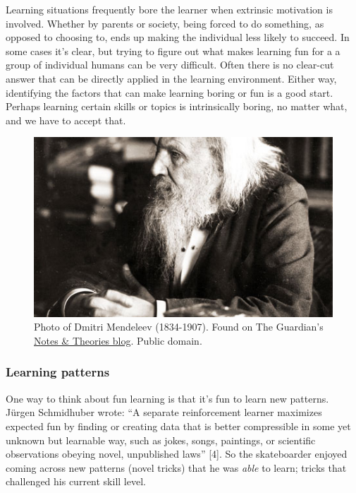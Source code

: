 Learning situations frequently bore the learner when extrinsic
motivation is involved. Whether by parents or society, being forced to
do something, as opposed to choosing to, ends up making the individual
less likely to succeed. In some cases it's clear, but trying to figure
out what makes learning fun for a a group of individual humans can be
very difficult. Often there is no clear-cut answer that can be directly
applied in the learning environment. Either way, identifying the factors
that can make learning boring or fun is a good start. Perhaps learning
certain skills or topics is intrinsically boring, no matter what, and we
have to accept that.

\begin{figure}
\begin{center}
\includegraphics[width=.8\textwidth]{./pictures/mendeleev.jpg}
\caption{Photo of Dmitri Mendeleev (1834-1907). Found on The Guardian's \href{http://www.guardian.co.uk/science/blog/2011/dec/07/dmitri-mendeleev-business-card}{Notes \& Theories blog}. Public domain.}
\end{center}
\end{figure}


\subsubsection{Learning patterns}

One way to think about fun learning is that it's fun to learn new
patterns. Jürgen Schmidhuber wrote: ``A separate reinforcement learner
maximizes expected fun by finding or creating data that is better
compressible in some yet unknown but learnable way, such as jokes,
songs, paintings, or scientific observations obeying novel, unpublished
laws'' {[}4{]}. So the skateboarder enjoyed coming across new patterns
(novel tricks) that he was \emph{able} to learn; tricks that challenged
his current skill level.

